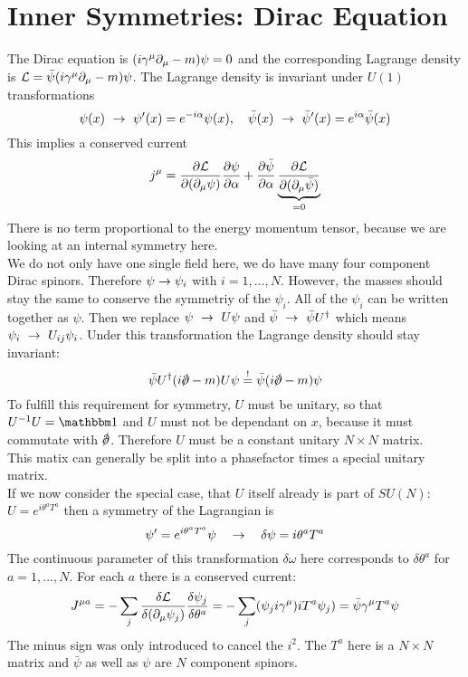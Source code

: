 \section{Inner Symmetries: Dirac Equation}
The Dirac equation is $(i \gamma^\mu \partial_\mu - m ) \psi = 0$ and the corresponding Lagrange density is $\mathcal{L} = \bar{\psi}(i \gamma^\mu \partial_\mu - m ) \psi$. The Lagrange density is invariant under $U(1)$ transformations
\[ \psi(x) ~\rightarrow~ \psi'(x) = e^{-i\alpha}\psi(x), ~~~ \bar{\psi}(x) ~\rightarrow~ \bar{\psi}'(x) = e^{i\alpha} \bar{\psi}(x)\]
This implies a conserved current
\[ j^\mu = \frac{\partial \mathcal{L}}{\partial ( \partial_\mu \psi)} \frac{\partial \psi}{\partial \alpha} + \frac{\partial \bar{\psi}}{\partial \alpha} \underbrace{ \frac{\partial \mathcal{L}}{\partial( \partial_\mu \bar{\psi})}}_{ = 0} \]
There is no term proportional to the energy momentum tensor, because we are looking at an internal symmetry here.\\
We do not only have one single field here, we do have many four component Dirac spinors. Therefore $\psi \rightarrow \psi_i$ with $i = 1, \ldots, N$. However, the masses should stay the same to conserve the symmetriy of the $\psi_i$. All of the $\psi_i$ can be written together as $\psi$. Then we replace $\psi ~\rightarrow~ U\psi$ and $\bar{\psi} ~\rightarrow~ \bar{\psi}U^\dagger$ which means $\psi_i ~\rightarrow~ U_{ij}\psi_i$. Under this transformation the Lagrange density should stay invariant:
\[ \bar{\psi} U^\dagger ( i \slashed{\p} - m ) U \psi \soll \bar{\psi}(i \slashed{\p} - m ) \psi\]
To fulfill this requirement for symmetry, $U$ must be unitary, so that $U^{-1}U = \ehm$ and $U$ must not be dependant on $x$, because it must commutate with $\slashed{\p}$. Therefore $U$ must be a constant unitary $N \times N$ matrix.\\
This matix can generally be split into a phasefactor times a special unitary matrix.\\
If we now consider the special case, that $U$ itself already is part of $SU(N)$: $U = e^{i \theta^a T^a}$ then a symmetry of the Lagrangian is
\[ \psi' = e^{i \theta^a T^a} \psi ~~~\rightarrow ~~~ \delta \psi = i \theta^a T^a\]
The continuous parameter of this transformation $\delta \omega$ here corresponds to $\delta \theta^a$ for $a = 1, \ldots, N$. For each $a$ there is a conserved current:
\[ J^{\mu a} = - \sum_j \frac{\delta \mathcal{L}}{\delta( \partial_\mu \psi_j)} \frac{\delta \psi_j}{\delta \theta^a} = - \sum _j ( \psi_j i \gamma^\mu) i T^a \psi_j) = \bar{\psi} \gamma^\mu T^a \psi\]
The minus sign was only introduced to cancel the $i^2$. The $T^a$ here is a $N \times N$ matrix and $\bar{\psi}$ as well as $\psi$ are $N$ component spinors.\\
